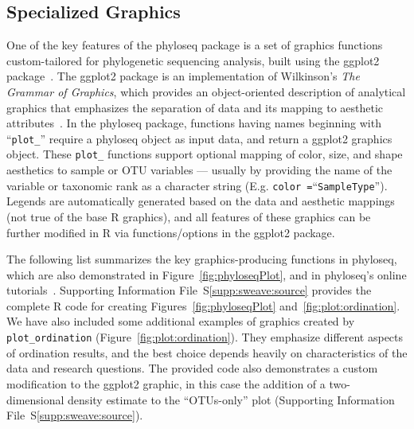 \documentclass[10pt]{article}\usepackage{graphicx, color}
\newcommand{\R}{{\textsf{R}}}
\newcommand{\code}[1]{{\texttt{#1}}}
\begin{document}
\subsection*{Specialized Graphics}\label{sec:graphics:functions}

One of the key features of the phyloseq package
is a set of graphics functions custom-tailored
for phylogenetic sequencing analysis,
built using the ggplot2 package~\cite{ggplot2}.
The ggplot2 package is an implementation
of Wilkinson's \emph{The Grammar of Graphics},
which provides an object-oriented description
of analytical graphics that emphasizes
the separation of data
and its mapping to aesthetic attributes~\cite{Wilkinson:GoG}.
In the phyloseq package,
functions having names beginning with ``\code{plot{\_}}''
require a phyloseq object as input data,
and return a ggplot2 graphics object.
These \code{plot{\_}} functions support optional mapping
of color, size, and shape aesthetics
to sample or OTU variables ---
usually by providing the name of
the variable or taxonomic rank
as a character string
(E.g. \code{color =}``\code{SampleType}'').
Legends are automatically generated
based on the data and aesthetic mappings
(not true of the base \R{} graphics),
and all features of these graphics
can be further modified in \R{}
via functions/options in the ggplot2 package.

The following list summarizes the key graphics-producing functions in phyloseq,
which are also demonstrated in Figure~\ref{fig:phyloseqPlot},
and in phyloseq's online tutorials~\cite{phyloseq:github}.
Supporting Information File~S\ref{supp:sweave:source} provides the complete R code for creating Figures~\ref{fig:phyloseqPlot} and~\ref{fig:plot:ordination}.
We have also included some additional examples
of graphics created by \code{plot{\_}ordination}
(Figure~\ref{fig:plot:ordination}).
They emphasize different aspects of ordination results, 
and the best choice depends heavily
on characteristics of the data
and research questions.
The provided code also demonstrates
a custom modification to the ggplot2 graphic,
in this case the addition of a two-dimensional density estimate
to the ``OTUs-only'' plot
(Supporting Information File~S\ref{supp:sweave:source}).
\end{document}
